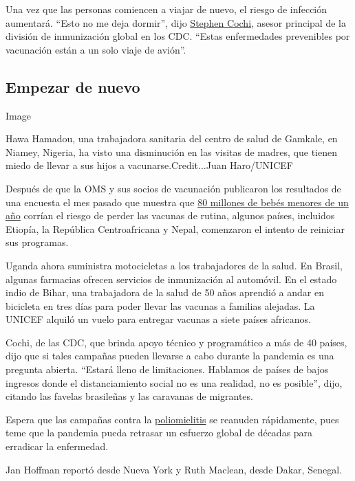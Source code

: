 Una vez que las personas comiencen a viajar de nuevo, el riesgo de
infección aumentará. ``Esto no me deja dormir'', dijo
\href{https://www.cdc.gov/media/spokesperson/sme-bio/cochi.html}{Stephen
Cochi}, asesor principal de la división de inmunización global en los
CDC. ``Estas enfermedades prevenibles por vacunación están a un solo
viaje de avión''.

\hypertarget{empezar-de-nuevo}{%
\subsection{Empezar de nuevo}\label{empezar-de-nuevo}}

Image

Hawa Hamadou, una trabajadora sanitaria del centro de salud de Gamkale,
en Niamey, Nigeria, ha visto una disminución en las visitas de madres,
que tienen miedo de llevar a sus hijos a vacunarse.Credit...Juan
Haro/UNICEF

Después de que la OMS y sus socios de vacunación publicaron los
resultados de una encuesta el mes pasado que muestra que
\href{https://www.nytimes3xbfgragh.onion/es/2020/05/25/espanol/ciencia-y-tecnologia/vacuna-polio-sarampion-coronavirus.html}{80
millones de bebés menores de un año} corrían el riesgo de perder las
vacunas de rutina, algunos países, incluidos Etiopía, la República
Centroafricana y Nepal, comenzaron el intento de reiniciar sus
programas.

Uganda ahora suministra motocicletas a los trabajadores de la salud. En
Brasil, algunas farmacias ofrecen servicios de inmunización al
automóvil. En el estado indio de Bihar, una trabajadora de la salud de
50 años aprendió a andar en bicicleta en tres días para poder llevar las
vacunas a familias alejadas. La UNICEF alquiló un vuelo para entregar
vacunas a siete países africanos.

Cochi, de las CDC, que brinda apoyo técnico y programático a más de 40
países, dijo que si tales campañas pueden llevarse a cabo durante la
pandemia es una pregunta abierta. ``Estará lleno de limitaciones.
Hablamos de países de bajos ingresos donde el distanciamiento social no
es una realidad, no es posible'', dijo, citando las favelas brasileñas y
las caravanas de migrantes.

Espera que las campañas contra la
\href{https://www.cdc.gov/polio/}{poliomielitis} se reanuden
rápidamente, pues teme que la pandemia pueda retrasar un esfuerzo global
de décadas para erradicar la enfermedad.

Jan Hoffman reportó desde Nueva York y Ruth Maclean, desde Dakar,
Senegal.

